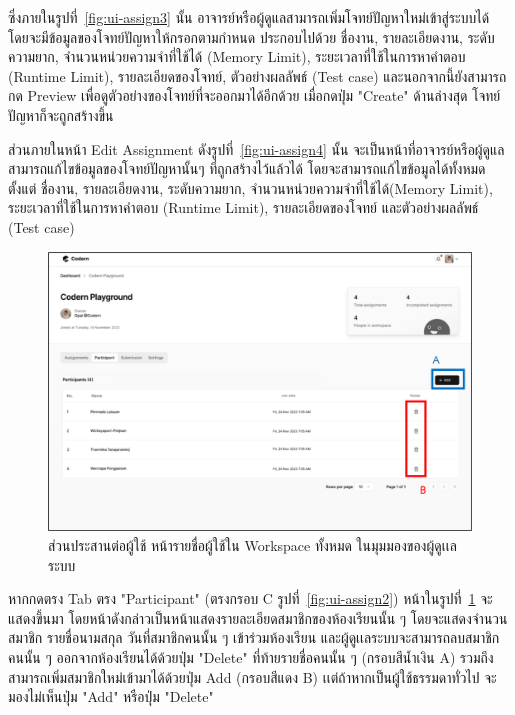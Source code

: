 \documentclass[12pt,one side,openright,a4paper]{cpe-thesis-th}
\newcommand{\thaijustify}[1]{%
  \par\hspace{30pt}\justifying
  #1
}
\begin{document}
    \thaijustify{
        ซึ่งภายในรูปที่~\ref{fig:ui-assign3} นั้น อาจารย์หรือผู้ดูแลสามารถเพิ่มโจทย์ปัญหาใหม่เข้าสู่ระบบได้ โดยจะมีข้อมูลของโจทย์ปัญหาให้กรอกตามกำหนด ประกอบไปด้วย ชื่องาน, รายละเอียดงาน, ระดับความยาก, จำนวนหน่วยความจำที่ใช้ได้ (Memory Limit), ระยะเวลาที่ใช้ในการหาคำตอบ (Runtime Limit), รายละเอียดของโจทย์, ตัวอย่างผลลัพธ์ (Test case) และนอกจากนี้ยังสามารถกด Preview เพื่อดูตัวอย่างของโจทย์ที่จะออกมาได้อีกด้วย เมื่อกดปุ่ม "Create" ด้านล่างสุด โจทย์ปัญหาก็จะถูกสร้างขึ้น
    }
    \thaijustify{
        ส่วนภายในหน้า Edit Assignment ดังรูปที่~\ref{fig:ui-assign4} นั้น จะเป็นหน้าที่อาจารย์หรือผู้ดูแลสามารถแก้ไขข้อมูลของโจทย์ปัญหานั้นๆ ที่ถูกสร้างไว้แล้วได้ โดยจะสามารถแก้ไขข้อมูลได้ทั้งหมด ตั้งแต่ ชื่องาน, รายละเอียดงาน, ระดับความยาก, จำนวนหน่วยความจำที่ใช้ได้(Memory Limit), ระยะเวลาที่ใช้ในการหาคำตอบ (Runtime Limit), รายละเอียดของโจทย์ และตัวอย่างผลลัพธ์ (Test case)
    }
    \pagebreak
    \hypertarget{ui-assign6}{
        \begin{figure}[H]
        \centering
            \includegraphics[width=15cm]{figure/ui/ui-assign6.png}
            \caption[ส่วนประสานต่อผู้ใช้ หน้ารายชื่อผู้ใช้ใน Workspace ทั้งหมดในมุมมองของผู้ดูเเลระบบ]{ส่วนประสานต่อผู้ใช้ หน้ารายชื่อผู้ใช้ใน Workspace ทั้งหมด ในมุมมองของผู้ดูเเลระบบ}
            \label{fig:ui-assign6}
        \end{figure}
    }
    \thaijustify{
        หากกดตรง Tab ตรง "Participant" (ตรงกรอบ C รูปที่~\ref{fig:ui-assign2}) หน้าในรูปที่~\ref{fig:ui-assign6} จะแสดงขึ้นมา โดยหน้าดังกล่าวเป็นหน้าแสดงรายละเอียดสมาชิกของห้องเรียนนั้น ๆ โดยจะแสดงจำนวนสมาชิก รายชื่อนามสกุล วันที่สมาชิกคนนั้น ๆ เข้าร่วมห้องเรียน และผู้ดูเเลระบบจะสามารถลบสมาชิกคนนั้น ๆ ออกจากห้องเรียนได้ด้วยปุ่ม "Delete" ที่ท้ายรายชื่อคนนั้น ๆ (กรอบสีน้ำเงิน A) รวมถึงสามารถเพิ่มสมาชิกใหม่เข้ามาได้ด้วยปุ่ม Add (กรอบสีแดง B) เเต่ถ้าหากเป็นผู้ใช้ธรรมดาทั่วไป จะมองไม่เห็นปุ่ม "Add" หรือปุ่ม "Delete"
    }
\end{document}
